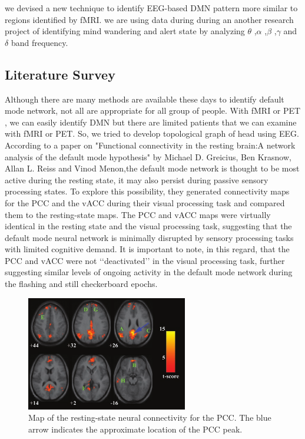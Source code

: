 we devised a new technique to identify EEG-based DMN pattern more similar to regions identified by fMRI. we are using data during during an another research project of identifying mind wandering and alert state by analyzing $\theta$ ,$\alpha$ ,$\beta$ ,$\gamma$ and $\delta$ band frequency.

\subsection{Literature Survey}

Although there are many methods are available these days to identify default mode network, not all are appropriate for all group of people. With fMRI or PET , we can easily identify DMN but there are limited patients that we can examine with fMRI or PET. So, we tried to develop topological graph of head using EEG.
According to a paper on "Functional connectivity in the resting brain:A network analysis of the default mode hypothesis" by Michael D. Greicius, Ben Krasnow, Allan L. Reiss and Vinod Menon,the default mode network is thought to be most active during the resting state, it may also persist during passive sensory processing states. To explore this possibility, they generated connectivity maps for the PCC and the vACC during their visual processing task and compared them to the resting-state maps. The PCC and vACC maps were virtually identical in the resting state and the visual processing task, suggesting that the default mode neural network is minimally disrupted by sensory processing tasks with limited cognitive demand. It is important to note, in this regard, that the PCC and vACC were not ‘‘deactivated’’ in the visual processing task, further suggesting similar levels of ongoing activity in the default mode network during the flashing and still checkerboard epochs.
\begin{figure}
    \centering
    \includegraphics[height=5cm]{Pictures/fmri.png}
    \caption{Map of the resting-state neural connectivity for the PCC. The blue arrow indicates the approximate location of the PCC peak.}
    \label{fig5}
\end{figure}

